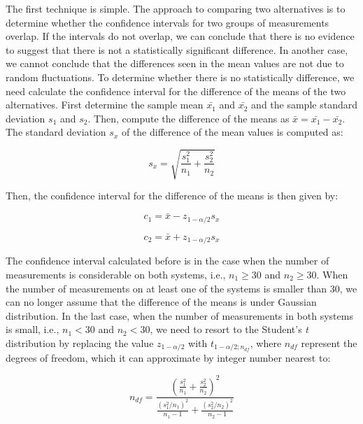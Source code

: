 \documentclass{latex/classes/thesis}
\begin{document}
The first technique is simple. The approach to comparing two alternatives is
to determine whether the confidence intervals for two groups of measurements
overlap. If the intervals do not overlap, we can conclude that there is no
evidence to suggest that there is not a statistically significant
difference. In another case, we cannot conclude that the differences seen in
the mean values are not due to random fluctuations. To determine whether
there is no statistically difference, we need calculate the confidence
interval for the difference of the means of the two alternatives. First
determine the sample mean \(\bar{x_1}\) and \(\bar{x_2}\) and the sample
standard deviation \(s_1\) and \(s_2\). Then, compute the difference of the
means as \(\bar{x} = \bar{x_1} - \bar{x_2}\). The standard deviation \(s_x\)
of the difference of the mean values is computed as:

\begin{equation}
  s_x = \sqrt{\frac{s_1^2}{n_1} + \frac{s_2^2}{n_2}}
\end{equation}

Then, the confidence interval for the difference of the means is then given
by:

\begin{equation}
  c_1 = \bar{x} - z_{1 - \alpha/2}s_x
\end{equation}

\begin{equation}
 c_2 = \bar{x} + z_{1 - \alpha/2}s_x
\end{equation}

The confidence interval calculated before is in the case when the number of
measurements is considerable on both systems, i.e., \(n_1 \ge 30\) and \(n_2
   \ge 30\). When the number of measurements on at least one of the systems is
smaller than 30, we can no longer assume that the difference of the means is
under Gaussian distribution. In the last case, when the number of
measurements in both systems is small, i.e., \(n_1 < 30\) and \(n_2 < 30\),
we need to resort to the Student's \emph{t} distribution by replacing the value
\(z_{1 - \alpha/2}\) with \(t_{1 - \alpha/2;n_{df}}\), where \(n_{df}\)
represent the degrees of freedom, which it can approximate by integer number
nearest to:

\begin{equation}
 n_{df} = \frac{(\frac{s_1^2}{n_1} + \frac{s_2^2}{n_2})^2}{\frac{(s_1^2/n_1)^2}{n_1 - 1} + \frac{(s_2^2/n_2)^2}{n_2 - 1}}
\end{equation}
\end{document}
